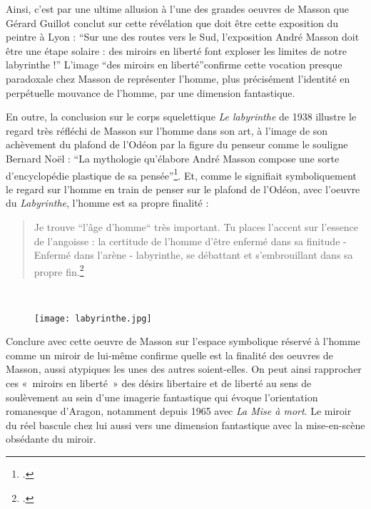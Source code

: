 	 Ainsi, c’est par une ultime allusion à l’une des grandes oeuvres de Masson que Gérard Guillot conclut sur cette révélation que doit être cette exposition du peintre à Lyon : \enquote{Sur une des routes vers le Sud, l’exposition André Masson doit être une étape solaire : des miroirs en liberté font exploser les limites de notre labyrinthe !} L’image \enquote{des miroirs en liberté}confirme cette vocation presque paradoxale chez Masson de représenter l’homme, plus précisément l’identité en perpétuelle mouvance de l’homme, par une dimension fantastique.

	En outre, la conclusion sur le corps squelettique \emph{Le labyrinthe} de 1938 illustre le regard très réfléchi de Masson sur l’homme dans son art, à l’image de son achèvement du plafond de l’Odéon par la figure du penseur comme le souligne Bernard Noël : \enquote{La mythologie qu’élabore André Masson compose une sorte d’encyclopédie plastique de sa pensée}\footcite[p73]{noel}. Et, comme le signifiait symboliquement le regard sur l’homme en train de penser sur le plafond de l’Odéon, avec l’oeuvre du \emph{Labyrinthe}, l’homme est sa propre finalité : 

\begin{quote}
Je trouve “l’âge d’homme“ très important. Tu places l’accent sur l’essence de l’angoisse : la certitude de l’homme d’être enfermé dans sa finitude - Enfermé dans l’arène - labyrinthe, se débattant et s’embrouillant dans sa propre fin.\footcite[p429]{anneessurrealistes}	
\end{quote}
 

\begin{figure}[H]
   \centering
   \texttt{[image: labyrinthe.jpg]}
	\caption{\cite{labyrinthe}}\label{fig:Labyrinthe}
\end{figure}


	 Conclure avec cette oeuvre de Masson sur l’espace symbolique réservé à l’homme comme un miroir de lui-même confirme quelle est la finalité des oeuvres de Masson, aussi atypiques les unes des autres soient-elles. On peut ainsi rapprocher ces « miroirs en liberté » des désirs libertaire et de liberté au sens de soulèvement au sein d’une imagerie fantastique qui évoque l’orientation romanesque d’Aragon, notamment depuis 1965 avec \emph{La Mise à mort}. Le miroir du réel bascule chez lui aussi vers une dimension fantastique avec la mise-en-scène obsédante du miroir. 

